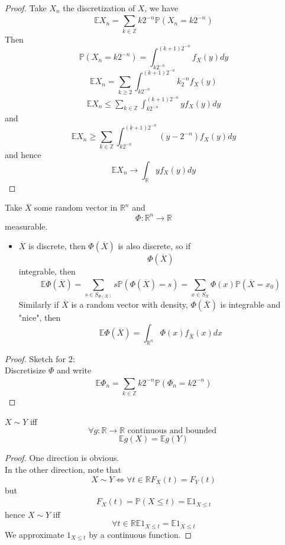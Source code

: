 \documentclass[../main.tex]{subfiles}
\begin{document}
\begin{proof}
Take $X_n$ the discretization of $X$, we have
\[ 
\mathbb{E} X_n = \sum_{k\in \mathbb{Z}}^{ }k 2^{-n}\mathbb{P}( X_n= k 2^{-n}) 
\]
Then
\[ 
\mathbb{P}( X_n = k 2^{-n}) = \int_{ k 2^{-n} }^{ ( k+1) 2^{-n} } f_X( y) dy
\]
\[ 
\mathbb{E}X_n = \sum_{k \geq 2}^{ } \int_{ k 2^{-n} }^{ ( k+1	)2^{-n}	  } k_2^{-n} f_X( y) 
\]
\begin{align*}
\mathbb{E}X_n \leq \sum_{k\in \mathbb{Z}} \int_{ k 2^{-n} }^{ ( k+1)2^{-n} } y f_X( y) dy
\end{align*}
and
\[ 
\mathbb{E}X_n \geq \sum_{k\in \mathbb{Z}}^{ }\int_{ k 2^{-n} }^{ ( k+1)2^{-n} } ( y-2^{-n}) f_X( y) dy 
\]
and hence
\[ 
\mathbb{E}X_n\to \int_{\mathbb{R}} y f_X( y) dy
\]


\end{proof}
\begin{propo}
Take $ \overline{X}$ some random vector in $ \mathbb{R}^n$ and 
\[ 
\Phi: \mathbb{R}^n\to \mathbb{R}
\]
measurable.

\begin{itemize}
\item $\overline{X}$ is discrete, then $\Phi( \overline{X}) $ is also discrete, so if
	\[ 
	\Phi( \overline{X}) 
	\]
	integrable, then
	\[ 
\mathbb{E} \Phi( \overline{X}) = \sum_{s\in S_{\Phi( X) } }^{ } s \mathbb{P}( \Phi( \overline{X}) =s) = \sum_{x\in S_X}^{ } \Phi( x) \mathbb{P}( \overline{X}= x_0) 	
	\]
Similarly if $\overline{X}$ is a random vector with density, $\Phi( \overline{X}) $ is integrable and "nice", then
\[ 
\mathbb{E}\Phi( \overline{X}) = \int_{ \mathbb{R}^n }^{  }\Phi( x) f_{\overline{X}} ( x) dx
\]

\end{itemize}

\end{propo}
\begin{proof}
Sketch for $2$:\\
Discretisize $\Phi$ and write
\[ 
\mathbb{E} \Phi_n = \sum_{k\in \mathbb{Z}}^{ } k 2^{-n} \mathbb{P}( \Phi_n= k 2^{-n}) 
\]

\end{proof}
\begin{propo}
$X\sim Y$ iff 
\[ 
\forall g : \mathbb{R}\to \mathbb{R} \text{ continuous and bounded } 
\]
\[ 
\mathbb{E}g( X) = \mathbb{E}g( Y) 
\]

\end{propo}
\begin{proof}
One direction is obvious.\\
In the other direction, note that
\[ 
X\sim Y \iff \forall t \in \mathbb{R} F_X( t) = F_Y( t) 
\]
but
\begin{align*}
F_X( t) = \mathbb{P}( X \leq t) = \mathbb{E}1_{X \leq t} 
\end{align*}
hence $X\sim Y$ iff
\[ 
\forall t \in \mathbb{R} \mathbb{E}1_{X \leq t} = \mathbb{E} 1_{X \leq t} 
\]
We approximate $ 1_{X \leq t} $ by a continuous function.
\end{proof}
\end{document}
